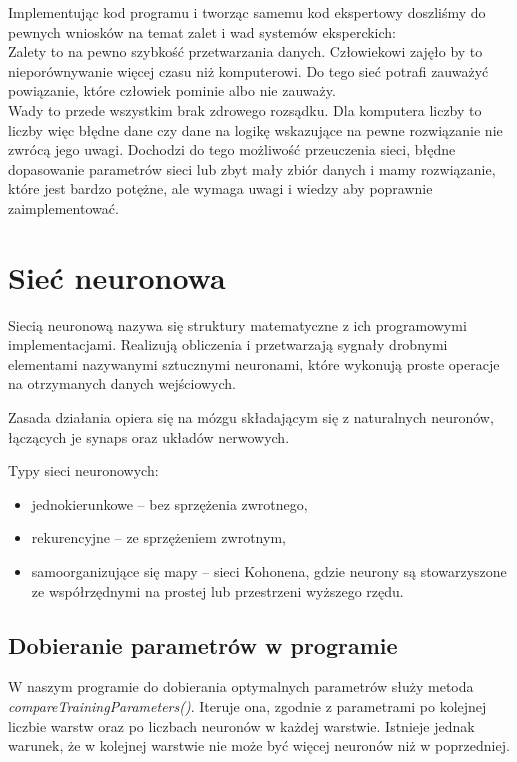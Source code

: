 \documentclass[12pt,a4paper]{article}
\begin{document}
	
	
	
	Implementując kod programu i tworząc samemu kod ekspertowy doszliśmy do pewnych wniosków na temat zalet i wad systemów eksperckich:\\
	Zalety to na pewno szybkość przetwarzania danych. Człowiekowi zajęło by to nieporównywanie więcej czasu niż komputerowi. Do tego sieć potrafi zauważyć powiązanie, które człowiek pominie albo nie zauważy.\\
	Wady to przede wszystkim brak zdrowego rozsądku. Dla komputera liczby to liczby więc błędne dane czy dane na logikę wskazujące na pewne rozwiązanie nie zwrócą jego uwagi. Dochodzi do tego możliwość przeuczenia sieci, błędne dopasowanie parametrów sieci lub zbyt mały zbiór danych i mamy rozwiązanie, które jest bardzo potężne, ale wymaga uwagi i wiedzy aby poprawnie zaimplementować.
	
	
	
	
	
\section*{Sieć neuronowa}
	
	Siecią neuronową nazywa się struktury matematyczne z ich programowymi implementacjami. Realizują obliczenia i przetwarzają sygnały drobnymi elementami nazywanymi sztucznymi neuronami, które wykonują proste operacje na otrzymanych danych wejściowych.
	
	Zasada działania opiera się na mózgu składającym się z naturalnych neuronów, łączących je synaps oraz układów nerwowych. 
	
	Typy sieci neuronowych:
	\begin{itemize}
		\item jednokierunkowe -- bez sprzężenia zwrotnego,
		\item rekurencyjne -- ze sprzężeniem zwrotnym,
		\item samoorganizujące się mapy -- sieci Kohonena, gdzie neurony są stowarzyszone ze współrzędnymi na prostej lub przestrzeni wyższego rzędu.
	\end{itemize}


	\subsection*{Dobieranie parametrów w programie}
	
	W naszym programie do dobierania optymalnych parametrów służy metoda \emph{compareTrainingParameters()}. Iteruje ona, zgodnie z parametrami po kolejnej liczbie warstw oraz po liczbach neuronów w każdej warstwie. Istnieje jednak warunek, że w kolejnej warstwie nie może być więcej neuronów niż w poprzedniej.
	
\end{document}
